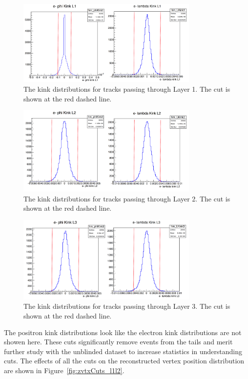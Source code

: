 \documentclass[twoside]{article}
\begin{document}
\begin{figure}[H]
  \centering
      \includegraphics[width=0.8\textwidth]{plots/kink1.png}
  \caption{The kink distributions for tracks passing through Layer 1. The cut is shown at the red dashed line.}
  \label{fig:kink1}
\end{figure} 
\begin{figure}[H]
  \centering
      \includegraphics[width=0.8\textwidth]{plots/kink2.png}
  \caption{The kink distributions for tracks passing through Layer 2. The cut is shown at the red dashed line.}
  \label{fig:kink2}
\end{figure} 
\begin{figure}[H]
  \centering
      \includegraphics[width=0.8\textwidth]{plots/kink3.png}
  \caption{The kink distributions for tracks passing through Layer 3. The cut is shown at the red dashed line.}
  \label{fig:kink3}
\end{figure} 

The positron kink distributions look like the electron kink distributions are not showen here. These cuts significantly remove events from the tails and merit further study with the unblinded dataset to increase statistics in understanding cuts. The effects of all the cuts on the reconstructed vertex position distribution are shown in Figure~\ref{fig:zvtxCuts_l1l2}.
\end{document}
